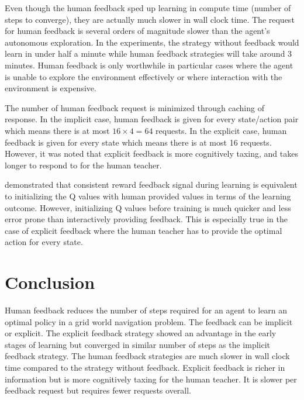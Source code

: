 \documentclass[conference]{IEEEtran}
\begin{document}
Even though the human feedback sped up learning in compute time (number of steps to converge), they are actually much slower in wall clock time. The request for human feedback is several orders of magnitude slower than the agent's autonomous exploration. In the experiments, the strategy without feedback would learn in under half a minute while human feedback strategies will take around 3 minutes. Human feedback is only worthwhile in particular cases where the agent is unable to explore the environment effectively or where interaction with the environment is expensive.

The number of human feedback request is minimized through caching of response. In the implicit case, human feedback is given for every state/action pair which means there is at most \(16 \times 4 = 64\) requests. In the explicit case, human feedback is given for every state which means there is at most 16 requests. However, it was noted that explicit feedback is more cognitively taxing, and takes longer to respond to for the human teacher.

\cite{wiewioraPotentialBasedShapingQValue2003} demonstrated that consistent reward feedback signal during learning is equivalent to initializing the Q values with human provided values in terms of the learning outcome. However, initializing Q values before training is much quicker and less error prone than interactively providing feedback. This is especially true in the case of explicit feedback where the human teacher has to provide the optimal action for every state.

\section{Conclusion}

Human feedback reduces the number of steps required for an agent to learn an optimal policy in a grid world navigation problem. The feedback can be implicit or explicit. The explicit feedback strategy showed an advantage in the early stages of learning but converged in similar number of steps as the implicit feedback strategy. The human feedback strategies are much slower in wall clock time compared to the strategy without feedback. Explicit feedback is richer in information but is more cognitively taxing for the human teacher. It is slower per feedback request but requires fewer requests overall.



\end{document}
